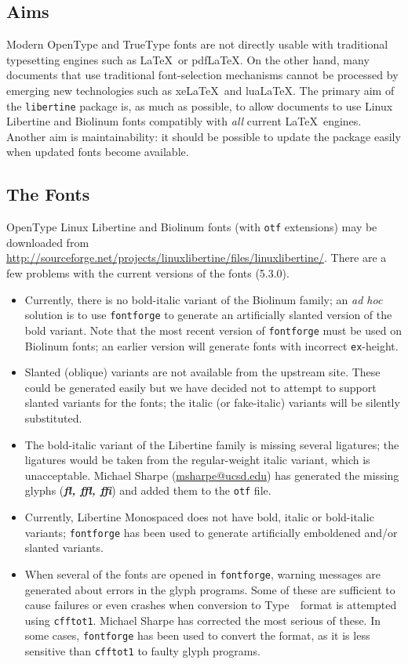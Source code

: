 \documentclass[11pt]{article}
\newcommand{\typeone}{Type~\liningnums{1}}
\begin{document}
\subsection{Aims}

Modern OpenType and TrueType fonts are not directly usable with traditional
typesetting engines such as \LaTeX\ or pdf\LaTeX.  On the other hand, many documents
that use traditional font-selection mechanisms cannot be processed by
emerging new technologies such as xe\LaTeX\ and lua\LaTeX.  The primary aim
of the \texttt{libertine} package is, as much as possible, to allow documents
to use Linux Libertine and Biolinum fonts compatibly with \emph{all} current \LaTeX\
engines.  Another aim is maintainability: it should be possible to update
the package easily when updated fonts become available.

\subsection{The Fonts}

OpenType Linux Libertine and Biolinum fonts (with \texttt{otf} extensions) may be downloaded from 
\url{http://sourceforge.net/projects/linuxlibertine/files/linuxlibertine/}.
There are a few problems with the current versions of the fonts (5.3.0).
\begin{itemize}
\item 
Currently, there is no bold-italic variant of the Biolinum family; an \emph{ad hoc}
solution is to use \texttt{fontforge} to generate an artificially slanted
version of the bold variant.  Note that the most recent version of \texttt{fontforge}
must be used on Biolinum fonts; an earlier version will generate fonts with incorrect \texttt{ex}-height.
\item Slanted (oblique) variants are not available
from the upstream site.  These could be
generated easily but we have decided not to attempt to support slanted
variants for the fonts; the italic (or fake-italic) variants will be silently substituted.
\item
The bold-italic variant of the Libertine family is missing
several ligatures; the ligatures would be taken from the
regular-weight italic variant, which is unacceptable.
Michael Sharpe (\url{msharpe@ucsd.edu}) has generated
the missing glyphs  (\emph{\bfseries fl, ffl, ffi})  and added them to the \texttt{otf}
file.

\item Currently, Libertine Monospaced does not have bold, italic or bold-italic
variants; \texttt{fontforge} has been used to generate artificially emboldened and/or slanted
variants.

\item
When several of the fonts are opened in \texttt{fontforge}, warning
messages are generated about errors in the glyph programs.  Some of
these are sufficient to cause failures or even crashes when conversion
to \typeone\ format is attempted using \texttt{cfftot1}. Michael
Sharpe has corrected the most serious of these.  In some cases, 
\texttt{fontforge}
has been used to convert the format, as it is less sensitive than \texttt{cfftot1}
to faulty glyph programs.
\end{itemize}
\end{document}

